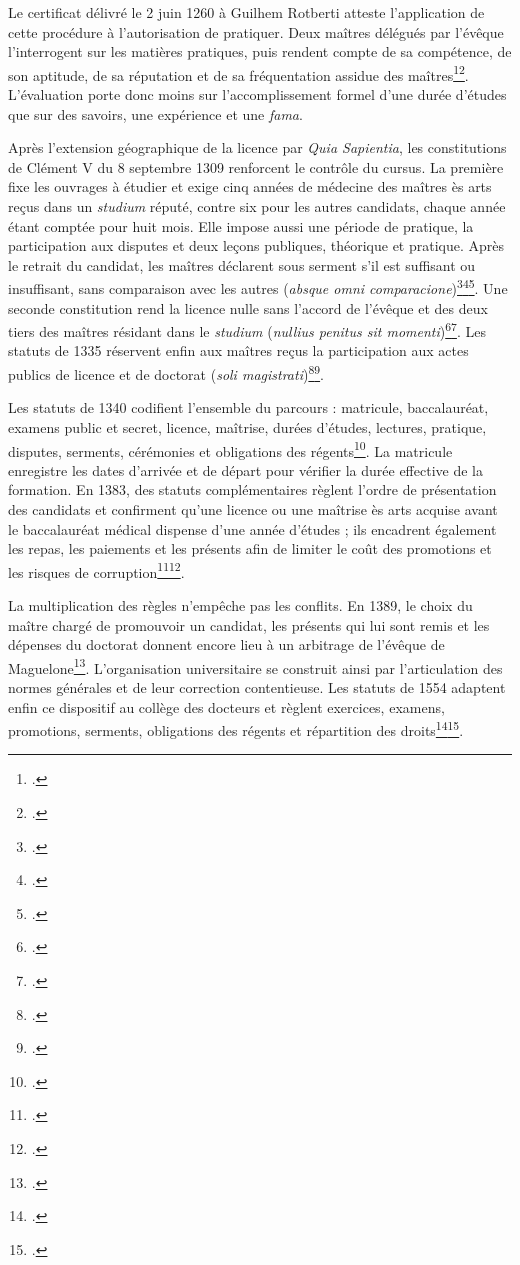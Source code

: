 Le certificat délivré le 2 juin 1260 à Guilhem Rotberti atteste l'application de cette procédure à l'autorisation de pratiquer. Deux maîtres délégués par l'évêque l'interrogent sur les matières pratiques, puis rendent compte de sa compétence, de son aptitude, de sa réputation et de sa fréquentation assidue des maîtres\footcite[fol.~14~v°--15~r°, vues~22--23/194]{ADHG1277}\footcite{Certificat1260}. L'évaluation porte donc moins sur l'accomplissement formel d'une durée d'études que sur des savoirs, une expérience et une \emph{fama}.

Après l'extension géographique de la licence par \emph{Quia Sapientia}, les constitutions de Clément V du 8 septembre 1309 renforcent le contrôle du cursus. La première fixe les ouvrages à étudier et exige cinq années de médecine des maîtres ès arts reçus dans un \emph{studium} réputé, contre six pour les autres candidats, chaque année étant comptée pour huit mois. Elle impose aussi une période de pratique, la participation aux disputes et deux leçons publiques, théorique et pratique. Après le retrait du candidat, les maîtres déclarent sous serment s'il est suffisant ou insuffisant, sans comparaison avec les autres (\emph{absque omni comparacione})\footcite[fol.~81~v°]{AHFMS1}\footcite{ClementVAuteurs1309}\footcite{Verger2023Examens}. Une seconde constitution rend la licence nulle sans l'accord de l'évêque et des deux tiers des maîtres résidant dans le \emph{studium} (\emph{nullius penitus sit momenti})\footcite[fol.~83~v°]{AHFMS1}\footcite{ClementVLicence1309}. Les statuts de 1335 réservent enfin aux maîtres reçus la participation aux actes publics de licence et de doctorat (\emph{soli magistrati})\footcite[fol.~68~v°, vue~76/194]{ADHG1277}\footcite{Statuts1335}.

Les statuts de 1340 codifient l'ensemble du parcours : matricule, baccalauréat, examens public et secret, licence, maîtrise, durées d'études, lectures, pratique, disputes, serments, cérémonies et obligations des régents\footcite{Statuts1340}. La matricule enregistre les dates d'arrivée et de départ pour vérifier la durée effective de la formation. En 1383, des statuts complémentaires règlent l'ordre de présentation des candidats et confirment qu'une licence ou une maîtrise ès arts acquise avant le baccalauréat médical dispense d'une année d'études ; ils encadrent également les repas, les paiements et les présents afin de limiter le coût des promotions et les risques de corruption\footcite{Statuts1383ADH}\footcite{Statuts1383AHFM}.

La multiplication des règles n'empêche pas les conflits. En 1389, le choix du maître chargé de promouvoir un candidat, les présents qui lui sont remis et les dépenses du doctorat donnent encore lieu à un arbitrage de l'évêque de Maguelone\footcite{Compromis1389}. L'organisation universitaire se construit ainsi par l'articulation des normes générales et de leur correction contentieuse. Les statuts de 1554 adaptent enfin ce dispositif au collège des docteurs et règlent exercices, examens, promotions, serments, obligations des régents et répartition des droits\footcite[fol.~160v--164v]{AHFMS1}\footcite[transcription des lettres patentes de Louis XII relatives à la fondation des docteurs stipendiés, p.~107--109]{Astruc1767}.

